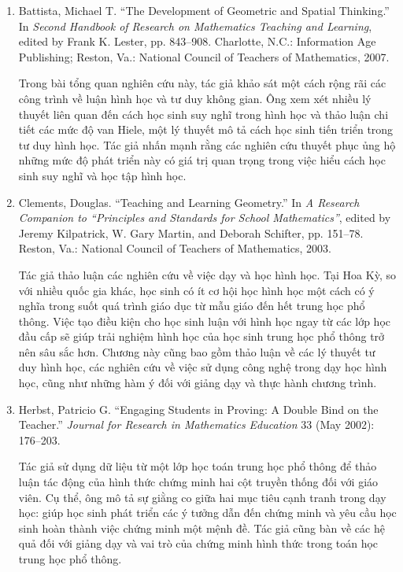 \documentclass[
  10pt,
  a4paper,
  landscape,
  twoside,
  openany
]{scrbook}
\newcommand{\VI}[1]{#1}
\newcommand{\NOTE}[1]{#1}
\begin{document}
{
\VI{
  \begin{enumerate}
    \item Battista, Michael T. ``The Development of Geometric and Spatial Thinking.'' In \emph{Second Handbook of Research on Mathematics Teaching and Learning}, edited by Frank K. Lester, pp. 843--908. Charlotte, N.C.: Information Age Publishing; Reston, Va.: National Council of Teachers of Mathematics, 2007.

      Trong bài tổng quan nghiên cứu này, tác giả khảo sát một cách rộng rãi các công trình về luận hình học và tư duy không gian. Ông xem xét nhiều lý thuyết liên quan đến cách học sinh suy nghĩ trong hình học và thảo luận chi tiết các mức độ van Hiele, một lý thuyết mô tả cách học sinh tiến triển trong tư duy hình học. Tác giả nhấn mạnh rằng các nghiên cứu thuyết phục ủng hộ những mức độ phát triển này có giá trị quan trọng trong việc hiểu cách học sinh suy nghĩ và học tập hình học.

    \item Clements, Douglas. ``Teaching and Learning Geometry.'' In \emph{A Research Companion to ``Principles and Standards for School Mathematics''}, edited by Jeremy Kilpatrick, W. Gary Martin, and Deborah Schifter, pp. 151--78. Reston, Va.: National Council of Teachers of Mathematics, 2003.

      Tác giả thảo luận các nghiên cứu về việc dạy và học hình học. Tại Hoa Kỳ, so với nhiều quốc gia khác, học sinh có ít cơ hội học hình học một cách có ý nghĩa trong suốt quá trình giáo dục từ mẫu giáo đến hết trung học phổ thông. Việc tạo điều kiện cho học sinh luận với hình học ngay từ các lớp học đầu cấp sẽ giúp trải nghiệm hình học của học sinh trung học phổ thông trở nên sâu sắc hơn. Chương này cũng bao gồm thảo luận về các lý thuyết tư duy hình học, các nghiên cứu về việc sử dụng công nghệ trong dạy học hình học, cũng như những hàm ý đối với giảng dạy và thực hành chương trình.
    
    \item Herbst, Patricio G. ``Engaging Students in Proving: A Double Bind on the Teacher.'' \emph{Journal for Research in Mathematics Education} 33 (May 2002): 176--203.

      Tác giả sử dụng dữ liệu từ một lớp học toán trung học phổ thông để thảo luận tác động của hình thức chứng minh hai cột truyền thống đối với giáo viên. Cụ thể, ông mô tả sự giằng co giữa hai mục tiêu cạnh tranh trong dạy học: giúp học sinh phát triển các ý tưởng dẫn đến chứng minh và yêu cầu học sinh hoàn thành việc chứng minh một mệnh đề. Tác giả cũng bàn về các hệ quả đối với giảng dạy và vai trò của chứng minh hình thức trong toán học trung học phổ thông.
  \end{enumerate}}
}
{
\NOTE{}
}
\end{document}
